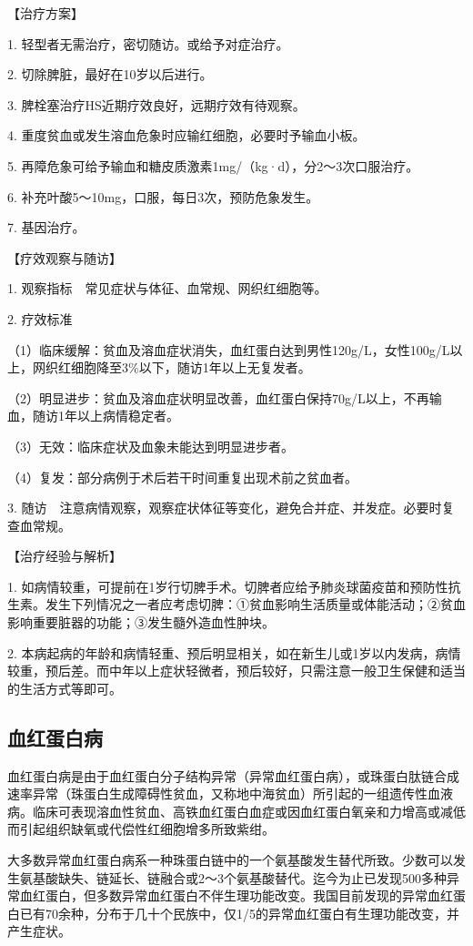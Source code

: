 【治疗方案】

1. 轻型者无需治疗，密切随访。或给予对症治疗。

2. 切除脾脏，最好在10岁以后进行。

3. 脾栓塞治疗HS近期疗效良好，远期疗效有待观察。

4. 重度贫血或发生溶血危象时应输红细胞，必要时予输血小板。

5.
再障危象可给予输血和糖皮质激素1mg/（kg·d），分2～3次口服治疗。

6. 补充叶酸5～10mg，口服，每日3次，预防危象发生。

7. 基因治疗。

【疗效观察与随访】

1. 观察指标　常见症状与体征、血常规、网织红细胞等。

2. 疗效标准

（1）临床缓解：贫血及溶血症状消失，血红蛋白达到男性120g/L，女性100g/L以上，网织红细胞降至3\%以下，随访1年以上无复发者。

（2）明显进步：贫血及溶血症状明显改善，血红蛋白保持70g/L以上，不再输血，随访1年以上病情稳定者。

（3）无效：临床症状及血象未能达到明显进步者。

（4）复发：部分病例于术后若干时间重复出现术前之贫血者。

3.
随访　注意病情观察，观察症状体征等变化，避免合并症、并发症。必要时复查血常规。

【治疗经验与解析】

1.
如病情较重，可提前在1岁行切脾手术。切脾者应给予肺炎球菌疫苗和预防性抗生素。发生下列情况之一者应考虑切脾：①贫血影响生活质量或体能活动；②贫血影响重要脏器的功能；③发生髓外造血性肿块。

2.
本病起病的年龄和病情轻重、预后明显相关，如在新生儿或1岁以内发病，病情较重，预后差。而中年以上症状轻微者，预后较好，只需注意一般卫生保健和适当的生活方式等即可。

\subsection{血红蛋白病}

血红蛋白病是由于血红蛋白分子结构异常（异常血红蛋白病），或珠蛋白肽链合成速率异常（珠蛋白生成障碍性贫血，又称地中海贫血）所引起的一组遗传性血液病。临床可表现溶血性贫血、高铁血红蛋白血症或因血红蛋白氧亲和力增高或减低而引起组织缺氧或代偿性红细胞增多所致紫绀。

大多数异常血红蛋白病系一种珠蛋白链中的一个氨基酸发生替代所致。少数可以发生氨基酸缺失、链延长、链融合或2～3个氨基酸替代。迄今为止已发现500多种异常血红蛋白，但多数异常血红蛋白不伴生理功能改变。我国目前发现的异常血红蛋白已有70余种，分布于几十个民族中，仅1/5的异常血红蛋白有生理功能改变，并产生症状。

